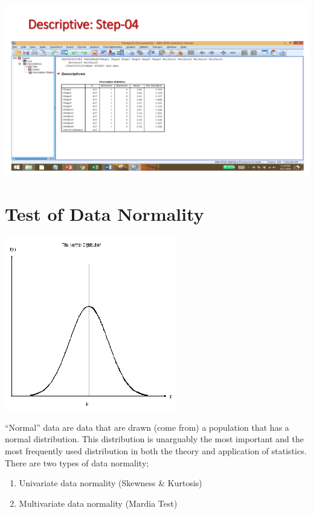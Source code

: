 \documentclass[
  letterpaper,
  DIV=11,
  numbers=noendperiod]{scrreprt}
\providecommand{\tightlist}{%
  \setlength{\itemsep}{0pt}\setlength{\parskip}{0pt}}\usepackage{longtable,booktabs,array}
\begin{document}
\includegraphics{images/slides/img_Page_037.png}


\chapter{Test of Data Normality}\label{test-of-data-normality}

\includegraphics{images/normal.png}

``Normal'' data are data that are drawn (come from) a population that
has a normal distribution. This distribution is unarguably the most
important and the most frequently used distribution in both the theory
and application of statistics. There are two types of data normality;\\

\begin{enumerate}
\def\labelenumi{\arabic{enumi}.}
\tightlist
\item
  Univariate data normality (Skewness \& Kurtosis)\\
\item
  Multivariate data normality (Mardia Test)\\
\end{enumerate}
\end{document}
